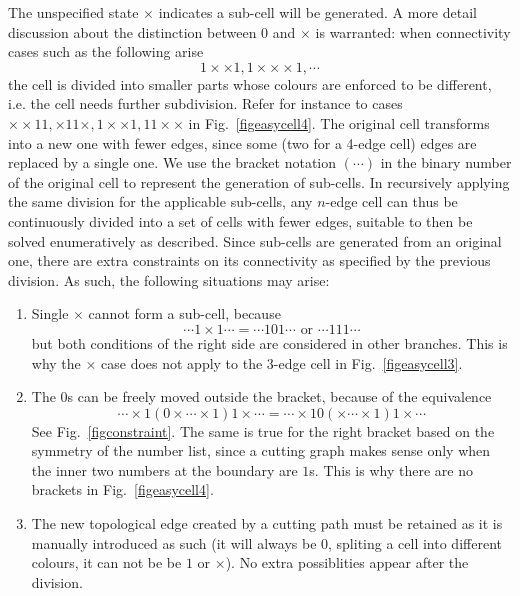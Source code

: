 \documentclass[journal]{IEEEtran}
\begin{document}
The unspecified state $\times$ indicates a sub-cell will be generated. %
A more detail discussion about the distinction between $0$ and $\times$ is warranted:
when connectivity cases such as the following arise 
$$1\times\times1, 1\times\times\times1, \cdots$$
the cell is divided into smaller parts whose colours are enforced to be different, i.e. the cell needs further subdivision.
Refer for instance to cases $\times\times11, \times11\times, 1\times\times1, 11\times\times$ in Fig.~\ref{figeasycell4}. 
The original cell transforms into a new one with fewer edges, since some (two for a 4-edge cell) %
edges are replaced by a single one.  
We use the bracket notation $(\cdots)$ in the binary number of the original cell to represent the generation of sub-cells.
In recursively applying the same division for the applicable sub-cells, any $n$-edge cell can thus be continuously divided into 
a set of cells with fewer edges, suitable to then be solved enumeratively as described. %
Since sub-cells are generated from an original one, there are extra constraints on its connectivity as specified by the previous division. 
As such, the following situations may arise:
\begin{enumerate}
\item Single $\times$ cannot form a sub-cell, because 
$$\cdots 1\times 1\cdots = \cdots 101\cdots \mbox{ or }\cdots 111\cdots$$
but both conditions of the right side are considered in other branches. This is why the $\times$ case does not apply 
to the 3-edge cell in Fig.~\ref{figeasycell3}.  
\item The $0$s can be freely moved outside the bracket, because of the equivalence 
$$\cdots\times1(0\times\cdots\times1)1\times\cdots = \cdots\times10(\times\cdots\times1)1\times\cdots$$ 
See Fig.~\ref{figconstraint}. 
The same is true for the right bracket based on the symmetry of the number list, since a cutting graph makes sense 
only when the inner two numbers at the boundary are $1$s. This is why there are no brackets in Fig.~\ref{figeasycell4}.
\item The new topological edge created by a cutting path must be retained as it is manually introduced as such 
(it will always be $0$, spliting a cell into different colours, it can not be be $1$ or $\times$).  
No extra possiblities appear after the division. 
\end{enumerate}
\end{document}
